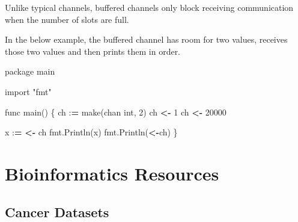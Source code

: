 \documentclass[]{book}
\newenvironment{Shaded}{\begin{snugshade}}{\end{snugshade}}
\newcommand{\BuiltInTok}[1]{#1}
\newcommand{\DecValTok}[1]{\textcolor[rgb]{0.00,0.00,0.81}{#1}}
\newcommand{\ImportTok}[1]{#1}
\newcommand{\NormalTok}[1]{#1}
\newcommand{\OperatorTok}[1]{\textcolor[rgb]{0.81,0.36,0.00}{\textbf{#1}}}
\newcommand{\StringTok}[1]{\textcolor[rgb]{0.31,0.60,0.02}{#1}}
\begin{document}
Unlike typical channels, buffered channels only block receiving communication when the number of slots are full.

In the below example, the buffered channel has room for two values, receives those two values and then prints them in order.

\begin{Shaded}
\begin{Highlighting}[]
\NormalTok{package main}

\ImportTok{import} \StringTok{"fmt"}

\NormalTok{func main() \{}
\NormalTok{    ch :}\OperatorTok{=}\NormalTok{ make(chan }\BuiltInTok{int}\NormalTok{, }\DecValTok{2}\NormalTok{)}
\NormalTok{    ch }\OperatorTok{<-} \DecValTok{1}
\NormalTok{    ch }\OperatorTok{<-} \DecValTok{20000}
    
\NormalTok{    x :}\OperatorTok{=} \OperatorTok{<-}\NormalTok{ ch}
\NormalTok{    fmt.Println(x)}
\NormalTok{    fmt.Println(}\OperatorTok{<-}\NormalTok{ch)}
\NormalTok{\}}
\end{Highlighting}
\end{Shaded}

\hypertarget{resources}{%
\chapter{Bioinformatics Resources}\label{resources}}

\hypertarget{cancer-datasets}{%
\section{Cancer Datasets}\label{cancer-datasets}}
\end{document}
